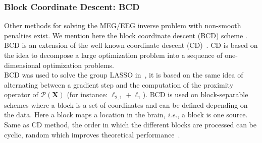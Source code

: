 

\subsubsection*{Block Coordinate Descent: BCD} \label{section:BCD}
Other methods for solving the MEG/EEG inverse problem with non-smooth penalties exist. We mention here the block coordinate descent (BCD) scheme \cite{tseng2010approximation}. BCD is an extension of the well known coordinate descent (CD)~\cite{li-osher:2009,nesterov2012efficiency}. CD is based on the idea to decompose a large optimization problem into a sequence of one-dimensional optimization problems. \\

BCD was used to solve the group LASSO in~\cite{rakotomamonjy2011surveying,qin2013efficient}, it is based on the same idea of alternating between a gradient step and the computation of the proximity operator of $\mathcal{P}(\mathbf{X})$ (for instance: $\ell_{2,1}+\ell_1$). BCD is used on block-separable schemes where a block is a set of coordinates and can be defined depending on the data. Here a block maps a location in the brain, \textit{i.e.}, a block is one source. Same as CD method, the order in which the different blocks are processed can be cyclic, random which improves theoretical performance~\cite{tseng2001convergence,wei2012doa}. \\


